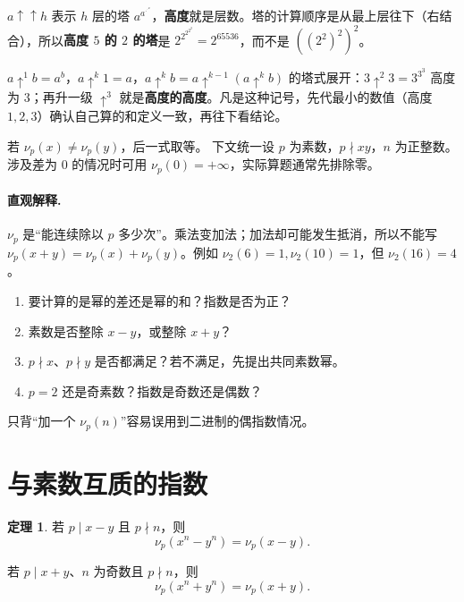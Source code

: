 \documentclass[UTF8,a4paper,11pt,twoside,openright,fontset=fandol]{ctexbook}
\theoremstyle{definition}
\newtheorem{theorem}[definition]{定理}
\begin{document}
\begin{tip}[幂塔与高度]
$a\uparrow\uparrow h$ 表示 $h$ 层的塔 $a^{a^{\cdot^{\cdot^a}}}$，\textbf{高度}就是层数。塔的计算顺序是从最上层往下（右结合），所以\textbf{高度 $5$ 的 $2$ 的塔}是 $2^{2^{2^{2^2}}}=2^{65536}$，而不是 $((2^2)^2)^2$。
\end{tip}

\begin{tip}[箭号记号的两条约定]
$a\uparrow^1 b=a^b$，$a\uparrow^{k}1=a$，$a\uparrow^{k}b=a\uparrow^{k-1}(a\uparrow^{k}b)$ 的塔式展开：$3\uparrow^2 3=3^{3^3}$ 高度为 $3$；再升一级 $\uparrow^3$ 就是\textbf{高度的高度}。凡是这种记号，先代最小的数值（高度 $1,2,3$）确认自己算的和定义一致，再往下看结论。
\end{tip}

若 $\nu_p(x)\ne\nu_p(y)$，后一式取等。
下文统一设 $p$ 为素数，$p\nmid xy$，$n$ 为正整数。涉及差为 $0$ 的情况时可用 $\nu_p(0)=+\infty$，实际算题通常先排除零。


\paragraph{直观解释.} $\nu_p$ 是“能连续除以 $p$ 多少次”。乘法变加法；加法却可能发生抵消，所以不能写 $\nu_p(x+y)=\nu_p(x)+\nu_p(y)$。例如 $\nu_2(6)=1,\nu_2(10)=1$，但 $\nu_2(16)=4$。
\begin{teach}
\begin{enumerate}
\item 要计算的是幂的差还是幂的和？指数是否为正？
\item 素数是否整除 $x-y$，或整除 $x+y$？
\item $p\nmid x$、$p\nmid y$ 是否都满足？若不满足，先提出共同素数幂。
\item $p=2$ 还是奇素数？指数是奇数还是偶数？
\end{enumerate}
只背“加一个 $\nu_p(n)$”容易误用到二进制的偶指数情况。
\end{teach}


\section{与素数互质的指数}
\begin{theorem}
若 $p\mid x-y$ 且 $p\nmid n$，则
\[
 \nu_p(x^n-y^n)=\nu_p(x-y).
\]



若 $p\mid x+y$、$n$ 为奇数且 $p\nmid n$，则
\[
 \nu_p(x^n+y^n)=\nu_p(x+y).
\]
\end{theorem}
\end{document}
